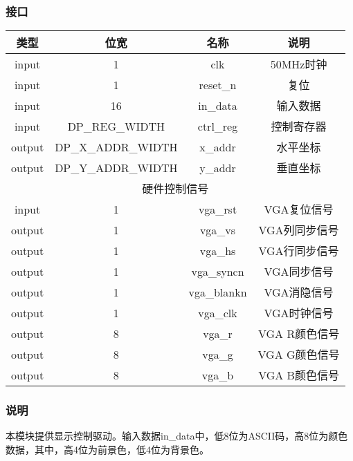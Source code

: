 \subsubsection{接口}
\begin{tabular}{|c|c|c|c|}
    \hline
    类型    &   位宽    &   名称    &   说明\\\hline
    input   &   1   &   clk &   50MHz时钟\\\hline
    input   &   1   &   reset\_n  &   复位\\\hline
    input   &   16   &   in\_data  &   输入数据\\\hline
    input   &   DP\_REG\_WIDTH   &   ctrl\_reg  &   控制寄存器\\\hline
    output   &   DP\_X\_ADDR\_WIDTH   &   x\_addr  &   水平坐标\\\hline
    output   &   DP\_Y\_ADDR\_WIDTH   &   y\_addr  &   垂直坐标\\\hline
    \multicolumn{4}{|c|}{硬件控制信号}\\\hline
    input   &   1   &   vga\_rst  &   VGA复位信号\\\hline
    output   &   1   &   vga\_vs  &   VGA列同步信号\\\hline
    output   &   1   &   vga\_hs  &   VGA行同步信号\\\hline
    output   &   1   &   vga\_syncn  &   VGA同步信号\\\hline
    output   &   1   &   vga\_blankn  &   VGA消隐信号\\\hline
    output   &   1   &   vga\_clk  &   VGA时钟信号\\\hline
    output   &   8   &   vga\_r  &   VGA R颜色信号\\\hline
    output   &   8   &   vga\_g  &   VGA G颜色信号\\\hline
    output   &   8   &   vga\_b  &   VGA B颜色信号\\\hline
\end{tabular}
\subsubsection{说明}
本模块提供显示控制驱动。输入数据in\_data中，低8位为ASCII码，高8位为颜色数据，其中，高4位为前景色，低4位为背景色。
